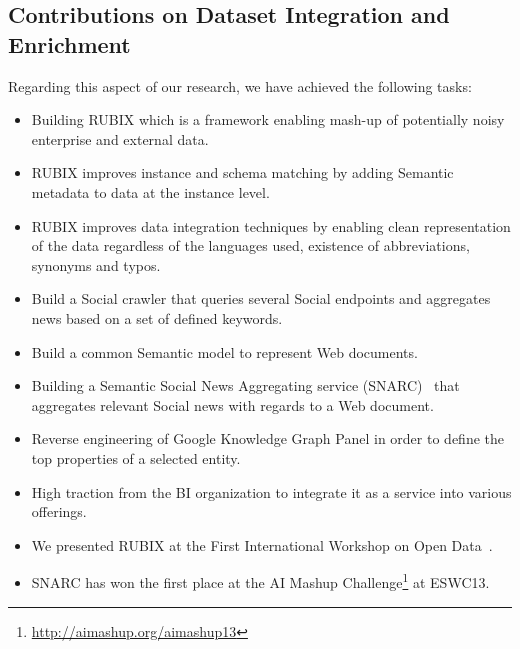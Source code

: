 \subsection{Contributions on Dataset Integration and Enrichment}
Regarding this aspect of our research, we have achieved the following tasks:
 \begin{itemize}
 \item Building RUBIX which is a framework enabling mash-up of potentially noisy enterprise and external data.
 \item RUBIX improves instance and schema matching by adding Semantic metadata to data at the instance level.
 \item RUBIX improves data integration techniques by enabling clean representation of the data regardless of the languages used, existence of abbreviations, synonyms and typos.
 \item Build a Social crawler that queries several Social endpoints and aggregates news based on a set of defined keywords.
 \item Build a common Semantic model to represent Web documents.
 \item Building a Semantic Social News Aggregating service (SNARC)~\cite{Assaf:ESWC:13} that aggregates relevant Social news with regards to a Web document.
 \item Reverse engineering of Google Knowledge Graph Panel in order to define the top properties of a selected entity.
 \item High traction from the BI organization to integrate it as a service into various offerings.
 \item We presented RUBIX at the First International Workshop on Open Data~\cite{Assaf:WOD:12}.
 \item SNARC has won the first place at the AI Mashup Challenge\footnote{\url{http://aimashup.org/aimashup13}} at ESWC13.
\end{itemize}

